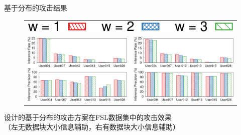 \documentclass[aspectratio=43]{beamer}
\begin{document}
\begin{frame}{基于分布的攻击结果}
\begin{figure}[H]
    \centering
    \begin{tabular}{p{.48\linewidth}p{.48\linewidth}}
        \multicolumn{2}{c}{\includegraphics[width=.35\textwidth]{img/legend-effectiveness.pdf}}  \\
        \includegraphics[width=\linewidth]{img/distribution-effectiveness-wo-size.pdf} &
        \includegraphics[width=\linewidth]{img/distribution-effectiveness-w-size.pdf}\\
    \end{tabular}
\end{figure}
\begin{card}
设计的基于分布的攻击方案在FSL数据集中的攻击效果\\[2mm]（左无数据块大小信息辅助，右有数据块大小信息辅助）
\end{card}  
\end{frame}
\end{document}
